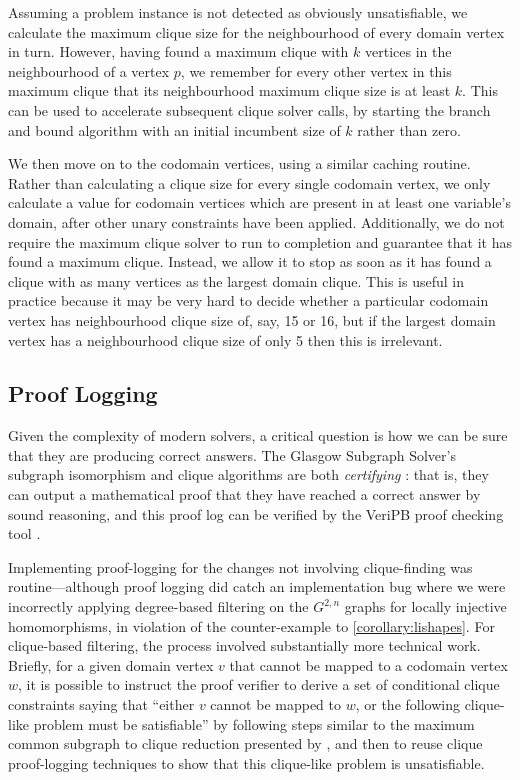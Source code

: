 \documentclass{article}
\newcommand{\citet}[1]{\citeauthor{#1} \shortcite{#1}}
\begin{document}
Assuming a problem instance is not detected as obviously unsatisfiable, we calculate the maximum
clique size for the neighbourhood of every domain vertex in turn. However, having found a maximum
clique with $k$ vertices in the neighbourhood of a vertex $p$, we remember for every other vertex in
this maximum clique that its neighbourhood maximum clique size is at least $k$. This can be used to
accelerate subsequent clique solver calls, by starting the branch and bound algorithm with an
initial incumbent size of $k$ rather than zero.

We then move on to the codomain vertices, using a similar caching routine. Rather than calculating a
clique size for every single codomain vertex, we only calculate a value for codomain vertices which are
present in at least one variable's domain, after other unary constraints have been applied.
Additionally, we do not require the maximum clique solver to run to completion and guarantee that it
has found a maximum clique. Instead, we allow it to stop as soon as it has found a clique with as
many vertices as the largest domain clique. This is useful in practice because it may be very hard
to decide whether a particular codomain vertex has neighbourhood clique size of, say, 15 or 16, but if
the largest domain vertex has a neighbourhood clique size of only 5 then this is irrelevant.

\subsection{Proof Logging}

Given the complexity of modern solvers, a critical question is how we can be sure
that they are producing correct answers. The Glasgow Subgraph Solver's subgraph isomorphism and
clique algorithms are both \emph{certifying} \cite{DBLP:journals/csr/McConnellMNS11}: that is, they
can output a mathematical proof that they have reached a correct answer by sound reasoning, and this
proof log can be verified by the VeriPB proof checking tool
\cite{DBLP:conf/cp/GochtMMNPT20,DBLP:conf/ijcai/GochtMN20}.

Implementing proof-logging for the changes not involving clique-finding was routine---although proof
logging did catch an implementation bug where we were incorrectly applying degree-based filtering on
the $G^{2,n}$ graphs for locally injective homomorphisms, in violation of the counter-example to
\cref{corollary:lishapes}. For clique-based filtering, the process involved substantially more
technical work. Briefly, for a given domain vertex $v$ that cannot be mapped to a codomain vertex
$w$, it is possible to instruct the proof verifier to derive a set of conditional clique constraints
saying that ``either $v$ cannot be mapped to $w$, or the following clique-like problem must be
satisfiable'' by following steps similar to the maximum common subgraph to clique reduction
presented by \citet{DBLP:conf/cp/GochtMMNPT20}, and then to reuse clique
proof-logging techniques to show that this clique-like problem is unsatisfiable.
\end{document}
